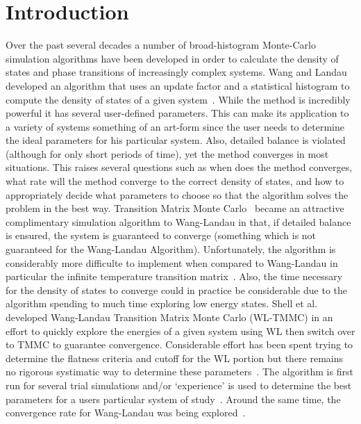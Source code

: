 \documentclass[letterpaper,twocolumn,amsmath,amssymb,pre,aps,10pt]{revtex4-1}
\begin{document}
\section{Introduction}
Over the past several decades a number of broad-histogram Monte-Carlo
simulation algorithms have been developed in order to calculate the
density of states and phase transitions of increasingly complex
systems.  Wang and Landau developed an algorithm that uses an update
factor and a statistical histogram to compute the density of states of
a given system~\cite{wang2001determining, wang2001efficient}.  While
the method is incredibly powerful it has several user-defined
parameters.  This can make its application to a variety of systems
something of an art-form since the user needs to determine the ideal
parameters for his particular system.  Also, detailed balance is
violated (although for only short periods of time), yet the method
converges in most situations.  This raises several questions such as
when does the method converges, what rate will the method converge to
the correct density of states, and how to appropriately decide what
parameters to choose so that the algorithm solves the problem in the
best way. Transition Matrix Monte Carlo~\cite{wang1999transition,
swendsen1999transition, fitzgerald2000monte} became an attractive
complimentary simulation algorithm to Wang-Landau in that, if detailed
balance is ensured, the system is guaranteed to converge (something
which is not guaranteed for the Wang-Landau Algorithm).  Unfortunately,
the algorithm is considerably more difficulte to implement when
compared to Wang-Landau in particular the infinite temperature
transition matrix~\cite{wang2002transition}.  Also, the time necessary
for the density of states to converge could in practice be considerable
due to the algorithm spending to much time exploring low energy states.
Shell et al.~\cite{shell2003improved, shell2004flat} developed
Wang-Landau Transition Matrix Monte Carlo (WL-TMMC) in an effort to
quickly explore the energies of a given system using WL then switch
over to TMMC to guarantee convergence. Considerable effort has been
spent trying to determine the flatness criteria and cutoff for the WL
portion but there remains no rigorous systimatic way to determine these
parameters~\cite{rane2013monte}.  The algorithm is first run for
several trial simulations and/or `experience' is used to determine the
best parameters for a users particular system of
study~\cite{siderius2013use}.  Around the same time, the convergence
rate for Wang-Landau was being explored~\cite{zhou2005understanding}.
\end{document}
